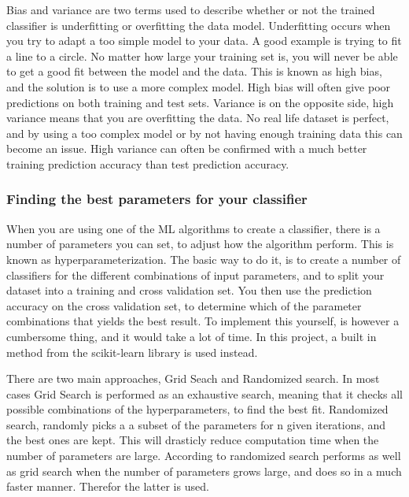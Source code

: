             Bias and variance are two terms used to describe whether or not the trained classifier is underfitting or overfitting the data model. Underfitting occurs when you try to adapt a too simple model to your data. A good example is trying to fit a line to a circle. No matter how large your training set is, you will never be able to get a good fit between the model and the data. This is known as high bias, and the solution is to use a more complex model. High bias will often give poor predictions on both training and test sets. Variance is on the opposite side, high variance means that you are overfitting the data. No real life dataset is perfect, and by using a too complex model or by not having enough training data this can become an issue. High variance can often be confirmed with a much better training prediction accuracy than test prediction accuracy.  

        \subsubsection{Finding the best parameters for your classifier}
            When you are using one of the ML algorithms to create a classifier, there is a number of parameters you can set, to adjust how the algorithm perform. This is known as hyperparameterization. The basic way to do it, is to create a number of classifiers for the different combinations of input parameters, and to split your dataset into a training and cross validation set. You then use the prediction accuracy on the cross validation set, to determine which of the parameter combinations that yields the best result. To implement this yourself, is however a cumbersome thing, and it would take a lot of time. In this project, a built in method from the scikit-learn library is used instead. 
            
            There are two main approaches, Grid Seach and Randomized search. In most cases Grid Search is performed as an exhaustive search, meaning that it checks all possible combinations of the hyperparameters, to find the best fit. Randomized search, randomly picks a a subset of the parameters for n given iterations, and the best ones are kept. This will drasticly reduce computation time when the number of parameters are large. According to \cite{BergstraJAMESBERGSTRA2012} randomized search performs as well as grid search when the number of parameters grows large, and does so in a much faster manner. Therefor the latter is used.
            
        
        
